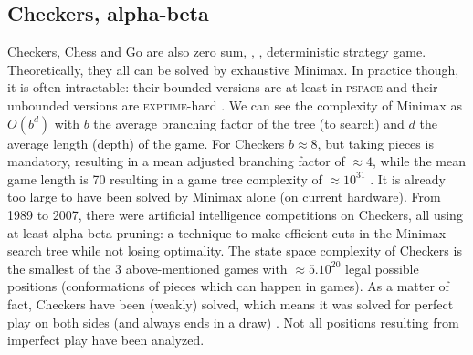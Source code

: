 \subsection{Checkers, alpha-beta}
Checkers, Chess and Go are also zero sum, , , deterministic strategy game. Theoretically, they all can be solved by exhaustive Minimax. 
In practice though, it is often intractable: their bounded versions are at least in \textsc{pspace} and their unbounded versions are \textsc{exptime}-hard \citep{GPC}. We can see the complexity of Minimax as $O(b^d)$ with $b$ the average branching factor of the tree (to search) and $d$ the average length (depth) of the game. 
For Checkers $b \approx 8$, but taking pieces is mandatory, resulting in a mean adjusted branching factor of $\approx 4$, while the mean game length is 70 resulting in a game tree complexity of $\approx 10^{31}$ \citep{allis1994}. It is already too large to have been solved by Minimax alone (on current hardware). From 1989 to 2007, there were artificial intelligence competitions on Checkers, all using at least alpha-beta pruning: a technique to make efficient cuts in the Minimax search tree while not losing optimality. 
The state space complexity of Checkers is the smallest of the 3 above-mentioned games with $\approx 5.10^{20}$ legal possible positions (conformations of pieces which can happen in games). As a matter of fact, Checkers have been (weakly) solved, which means it was solved for perfect play on both sides (and always ends in a draw) \citep{Schaeffer07}. Not all positions resulting from imperfect play have been analyzed. 

